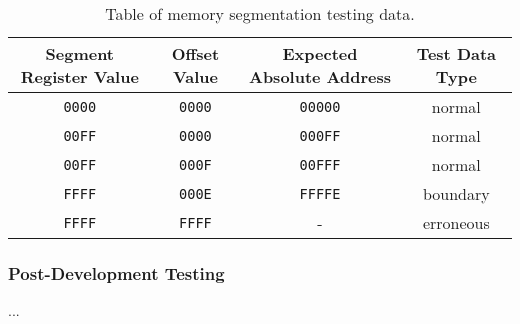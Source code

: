         \begin{table}
            \begin{tabular}{ | c | c | c | c | }
                \hline
                Segment Register Value & Offset Value & Expected Absolute Address & Test Data Type \\
                \hline
                \texttt{0000} & \texttt{0000} & \texttt{00000} & normal \\
                \texttt{00FF} & \texttt{0000} & \texttt{000FF} & normal \\
                \texttt{00FF} & \texttt{000F} & \texttt{00FFF} & normal \\
                \texttt{FFFF} & \texttt{000E} & \texttt{FFFFE} & boundary \\
                \texttt{FFFF} & \texttt{FFFF} & - & erroneous \\
                \hline
            \end{tabular}
            \caption{Table of memory segmentation testing data.}
            \label{table:segmentation-test-data}
        \end{table}

    \subsubsection{Post-Development Testing}
        ...
